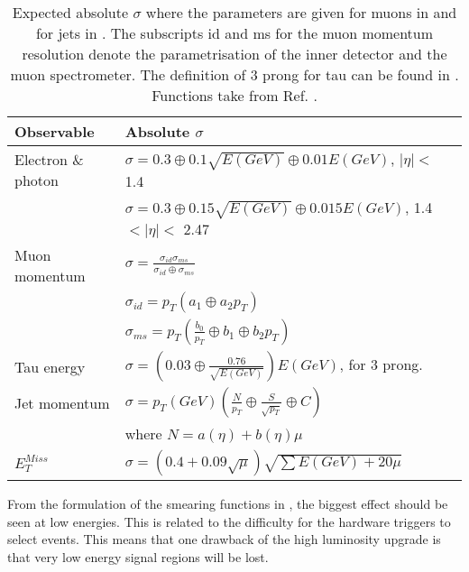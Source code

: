 \newpage
\begin{table}[H]
\renewcommand{\arraystretch}{1.5} %
\begin{center}
\begin{tabular}{|l|l|}
\hline
Observable & Absolute $\sigma$ \\ \hline
Electron \& photon & $\sigma=0.3\oplus 0.1\sqrt{E(GeV)}\oplus 0.01E(GeV)$, $|\eta|<$ 1.4 \\
& $\sigma=0.3\oplus 0.15\sqrt{E(GeV)}\oplus 0.015E(GeV)$, 1.4 $<|\eta|<$ 2.47 \\ \hline 
Muon momentum& $\sigma=\frac{\sigma_{id} \sigma_{ms}}{\sigma_{id} \oplus \sigma_{ms}}$\\
& $\sigma_{id}=p_T(a_1 \oplus a_2 p_T)$\\
& $\sigma_{ms}=p_T(\frac{b_0}{p_T} \oplus b_1 \oplus b_2 p_T)$\\ \hline
Tau energy& $\sigma =(0.03\oplus \frac{0.76}{\sqrt{E(GeV)}})E(GeV)$, for 3 prong.\\ \hline
Jet momentum& $\sigma = p_T(GeV)(\frac{N}{p_T} \oplus \frac{S}{\sqrt{p_T}} \oplus C)$ \\ 
& where $N=a(\eta)+b(\eta)\mu$ \\ \hline
$E_T^{Miss}$ & $\sigma = (0.4+0.09\sqrt{\mu})\sqrt{\sum E(GeV)+20\mu}$ \\ \hline
\end{tabular}
\end{center}
\renewcommand{\arraystretch}{1.0} %
\caption{{\footnotesize Expected absolute $\sigma$ where the parameters are given for muons in  and for jets in . The subscripts id and ms for the muon momentum resolution denote the parametrisation of the inner detector and the muon spectrometer. The definition of 3 prong for tau can be found in . Functions take from Ref. \citep{ATL-PHYS-PUB-2013-004}.}}
\label{tab:expected sigma}
\end{table}

From the formulation of the smearing functions in , the biggest effect should be seen at low energies. This is related to the difficulty for the hardware triggers to select events. This means that one drawback of the high luminosity upgrade is that very low energy signal regions will be lost.

